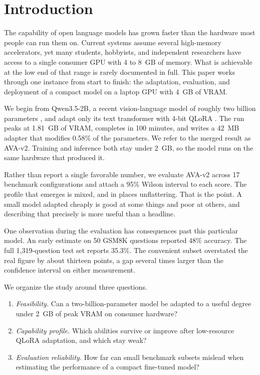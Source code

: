 \section{Introduction}

The capability of open language models has grown faster than the hardware most people can run them on. Current systems assume several high-memory accelerators, yet many students, hobbyists, and independent researchers have access to a single consumer GPU with 4 to 8~GB of memory. What is achievable at the low end of that range is rarely documented in full. This paper works through one instance from start to finish: the adaptation, evaluation, and deployment of a compact model on a laptop GPU with 4~GB of VRAM.

We begin from Qwen3.5-2B, a recent vision-language model of roughly two billion parameters \citep{qwen3_5}, and adapt only its text transformer with 4-bit QLoRA \citep{dettmers2023qlora,hu2021lora}. The run peaks at 1.81~GB of VRAM, completes in 100 minutes, and writes a 42~MB adapter that modifies 0.58\% of the parameters. We refer to the merged result as AVA-v2. Training and inference both stay under 2~GB, so the model runs on the same hardware that produced it.

Rather than report a single favorable number, we evaluate AVA-v2 across 17 benchmark configurations and attach a 95\% Wilson interval to each score. The profile that emerges is mixed, and in places unflattering. That is the point. A small model adapted cheaply is good at some things and poor at others, and describing that precisely is more useful than a headline.

One observation during the evaluation has consequences past this particular model. An early estimate on 50 GSM8K questions reported 48\% accuracy. The full 1{,}319-question test set reports 35.3\%. The convenient subset overstated the real figure by about thirteen points, a gap several times larger than the confidence interval on either measurement.

We organize the study around three questions.
\begin{enumerate}
  \item \emph{Feasibility.} Can a two-billion-parameter model be adapted to a useful degree under 2~GB of peak VRAM on consumer hardware?
  \item \emph{Capability profile.} Which abilities survive or improve after low-resource QLoRA adaptation, and which stay weak?
  \item \emph{Evaluation reliability.} How far can small benchmark subsets mislead when estimating the performance of a compact fine-tuned model?
\end{enumerate}

